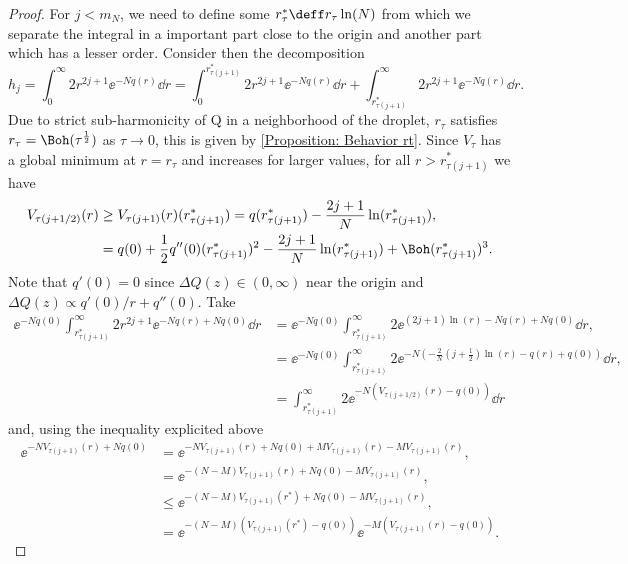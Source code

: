 \begin{proof}
For $j < m_N$, we need to define some $r^*_\tau \deff r_\tau \ln(N)$ from which we separate the integral in a important part close to the origin and another part which has a lesser order. Consider then the decomposition
\begin{equation}
	h_j = \int_{0}^{\infty} 2r^{2j+1} \ee^{-N q(r)} \dd r =\int_{0}^{r^*_{\tau(j+1)}} 2r^{2j+1} \ee^{-N q(r)} \dd r + \int_{r^*_{\tau(j+1)}}^{\infty} 2r^{2j+1} \ee^{-N q(r)} \dd r.
\end{equation}
Due to strict sub-harmonicity of Q in a neighborhood of the droplet, $r_\tau$ satisfies $r_\tau = \Boh (\tau^{\frac{1}{2}})$ as $\tau \rightarrow 0$, this is given by \autoref{Proposition: Behavior rt}. Since $V_\tau$ has a global minimum at $r = r_\tau$ and increases for larger values, for all $r > r^*_{\tau(j + 1)}$ we have
\begin{align}
	V_{\tau(j+1/2)}(r) & \geq V_{\tau(j+1)}(r)(r^*_{\tau(j+1)}) = q(r^*_{\tau(j+1)}) - \frac{2j + 1}{N} \ln(r^*_{\tau(j+1)}), \\
	& = q(0) + \frac{1}{2} q''(0)(r^*_{\tau(j+1)})^2 - \frac{2j + 1}{N} \ln(r^*_{\tau(j+1)}) + \Boh(r^*_{\tau(j+1)})^3.
\end{align}
Note that $q'(0) = 0$ since $\Delta Q(z) \in (0, \infty)$ near the origin and $\Delta Q(z) \propto q'(0)/r + q''(0)$. Take
\begin{align}
	\ee^{-N q(0)} \int_{r^*_{\tau(j+1)}}^{\infty} 2r^{2j+1} \ee^{-N q(r) + N q(0)} \dd r & =  \ee^{-N q(0)} \int_{r^*_{\tau(j+1)}}^{\infty} 2 \ee^{(2j+1) \ln(r) -N q(r) + N q(0)} \dd r, \\
	& = \ee^{-N q(0)} \int_{r^*_{\tau(j+1)}}^{\infty} 2 \ee^{- N \left(-\frac{2}{N}\left( j + \frac{1}{2} \right) \ln(r) - q(r) + q(0)\right)} \dd r, \\
	& = \int_{r^*_{\tau(j+1)}}^{\infty} 2 \ee^{-N (V_{\tau(j+1/2)}(r) - q(0))} \dd r
\end{align}
and, using the inequality explicited above
\begin{align}
	\ee^{- N V_{\tau(j+1)}(r) + N q(0)} & = \ee^{- N V_{\tau(j+1)}(r) + N q(0) + M V_{\tau(j+1)}(r) - M V_{\tau(j+1)}(r)}, \\
	& = \ee^{- (N - M) V_{\tau(j+1)}(r) + N q(0) - M V_{\tau(j+1)}(r)}, \\
	& \leq \ee^{- (N - M) V_{\tau(j+1)}(r^*) + N q(0) - M V_{\tau(j+1)}(r)}, \\
	& = \ee^{- (N - M) \left(V_{\tau(j+1)}(r^*) - q(0) \right)} \ee^{- M \left(V_{\tau(j+1)}(r) - q(0) \right)}.

\end{align}
\end{proof}
